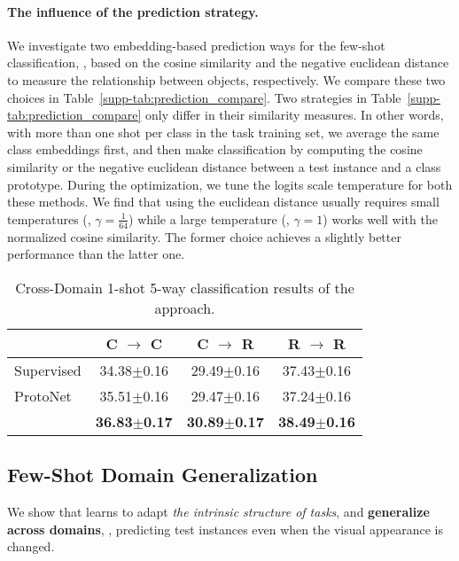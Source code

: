 \paragraph{The influence of the prediction strategy.} We investigate two embedding-based prediction ways for the few-shot classification, \ie, based on the cosine similarity and the negative euclidean distance to measure the relationship between objects, respectively. We compare these two choices in Table~\ref{supp-tab:prediction_compare}. 
Two strategies in Table~\ref{supp-tab:prediction_compare} only differ in their similarity measures. In other words, with more than one shot per class in the task training set, we average the same class embeddings first, and then make classification by computing the cosine similarity or the negative euclidean distance between a test instance and a class prototype. 
During the optimization, we tune the logits scale temperature for both these methods. 
We find that using the euclidean distance usually requires small temperatures (\eg, $\gamma = \frac{1}{64}$) while a large temperature (\eg, $\gamma=1$) works well with the normalized cosine similarity. The former choice achieves a slightly better performance than the latter one.

\begin{table}[tbp]
	\small
	\tabcolsep 5pt
	\centering
	\caption{Cross-Domain 1-shot 5-way classification results of the {\feat} approach.}
	\begin{tabular}{@{\;}lccc@{\;}}
		\addlinespace
		\toprule
		& \bf C $\rightarrow$ C & \bf C $\rightarrow$ R & \bf R $\rightarrow$ R\\ 
		\midrule
		Supervised     & 34.38{\tiny $\pm$0.16} & 29.49{\tiny $\pm$0.16} & 37.43{\tiny $\pm$0.16}\\
		{ProtoNet}    & 35.51{\tiny $\pm$0.16} &  29.47{\tiny $\pm$0.16} & 37.24{\tiny $\pm$0.16}\\
		\midrule
		{\feat}      & \bf 36.83{\tiny $\pm$0.17} & \bf 30.89{\tiny $\pm$0.17} & \bf 38.49{\tiny $\pm$0.16}\\
		\bottomrule
	\end{tabular}
	\label{supp-tab:generalization1}
\end{table}

\subsection{Few-Shot Domain Generalization} 
\label{sec:supp-generalization}
We show that \feat learns to adapt \textit{the intrinsic structure of tasks}, and \textbf{generalize across domains}, \ie, predicting test instances even when the visual appearance is changed.

